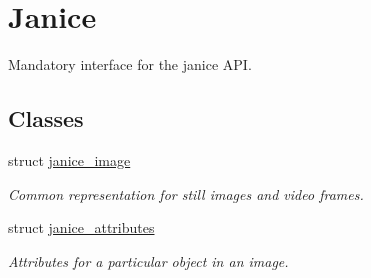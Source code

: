 \hypertarget{group__janice}{}\section{Janice}
\label{group__janice}


Mandatory interface for the janice A\+P\+I.  


\subsection*{Classes}
\begin{DoxyCompactItemize}
\item 
struct \hyperlink{structjanice__image}{janice\+\_\+image}
\begin{DoxyCompactList}\small\item\em Common representation for still images and video frames. \end{DoxyCompactList}\item 
struct \hyperlink{structjanice__attributes}{janice\+\_\+attributes}
\begin{DoxyCompactList}\small\item\em Attributes for a particular object in an image. \end{DoxyCompactList}\end{DoxyCompactItemize}
